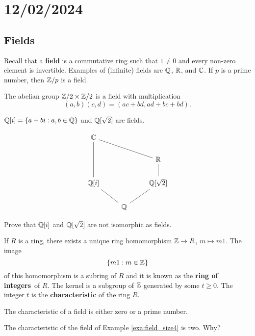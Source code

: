 \section{12/02/2024}

\subsection{Fields}

Recall that a \textbf{field} is a commutative
ring such that $1\ne 0$ and 
every non-zero element is invertible. Examples
of (infinite) fields are $\mathbb{Q}$, $\mathbb{R}$, and $\mathbb{C}$. If $p$
is a prime number, then $\mathbb{Z}/p$ is a field. 

\begin{example}
\label{exa:field_size4}
	The abelian group $\mathbb{Z}/2\times\mathbb{Z}/2$ is a field
	with multiplication
	\[
		(a,b)(c,d)=(ac+bd,ad+bc+bd).
	\]
\end{example}

\begin{example}
	$\mathbb{Q}[i]=\{a+bi:a,b\in\mathbb{Q}\}$ and 
	$\mathbb{Q}[\sqrt{2}]$ are fields.
\end{example}

\[
\begin{tikzcd}
	{\mathbb{C}} \\
	&& {\mathbb{R}} \\
	{\mathbb{Q}[i]} && {\mathbb{Q}[\sqrt{2}]} \\
	& {\mathbb{Q}}
	\arrow[no head, from=3-3, to=4-2]
	\arrow[no head, from=2-3, to=3-3]
	\arrow[no head, from=1-1, to=3-1]
	\arrow[no head, from=3-1, to=4-2]
	\arrow[no head, from=1-1, to=2-3]
\end{tikzcd}
\]


\begin{exercise}
\label{xca:Q(i)}
Prove that $\mathbb{Q}[i]$ and $\mathbb{Q}[\sqrt{2}]$ are not isomorphic as fields.
\end{exercise}

If $R$ is a ring, there exists a unique ring homomorphism
$\mathbb{Z}\to R$, $m\mapsto m1$. The image 
\[
\{m1:m\in\mathbb{Z}\}
\]
of this homomorphism is a subring 
of $R$ and it is known as the \textbf{ring of integers} of $R$. The
kernel is a subgroup of $\mathbb{Z}$ generated by
some $t\geq0$. The integer $t$ is 
the \textbf{characteristic} of the ring $R$. 

\begin{exercise}
The characteristic of a field is either zero or
a prime number. 
\end{exercise}

\begin{example}
    The characteristic of the field of Example \ref{exa:field_size4}
    is two. Why?
\end{example}

